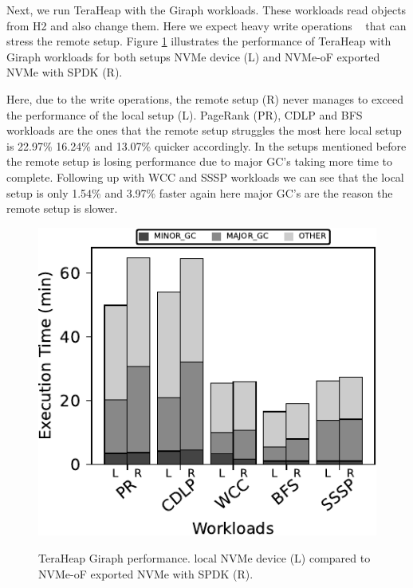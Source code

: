Next, we run TeraHeap with the Giraph workloads. These workloads read objects
from H2 and also change them. Here we expect heavy write operations
~\cite{giraph,teraheap} that can stress the remote setup. Figure
\ref{fig:bench_giraph} illustrates the performance of TeraHeap with Giraph
workloads for both setups NVMe device (L) and NVMe-oF exported NVMe with SPDK
(R).


Here, due to the write operations, the remote setup (R) never manages to exceed the performance of the local setup (L). PageRank (PR), CDLP and BFS workloads are the ones that the remote setup struggles the most here local setup is 22.97\% 16.24\% and 13.07\% quicker accordingly. In the setups mentioned before the remote setup is losing performance due to major GC's taking more time to complete. Following up with WCC and SSSP workloads we can see that the local setup is only 1.54\%	and 3.97\% faster again here major GC's are the reason the remote setup is slower.
\begin{figure}[H]
  \includegraphics[width=\linewidth]{figures/bench_giraph.pdf}\\
\caption{TeraHeap Giraph performance. local NVMe device (L) compared to NVMe-oF exported NVMe with SPDK (R).}
\label{fig:bench_giraph}
\end{figure}

\vspace{0.65em}
